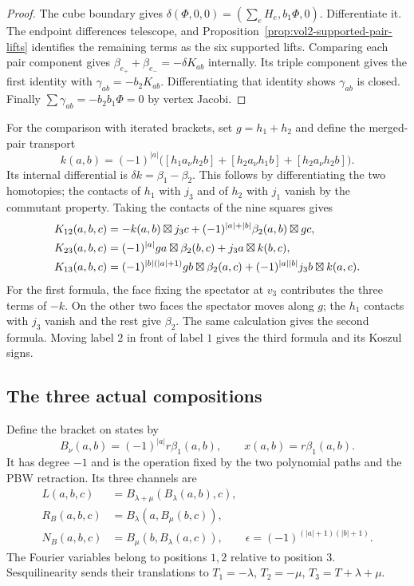 \begin{proof}
The cube boundary gives
$\delta(\Phi,0,0)=(\sum_eH_e,b_1\Phi,0)$.
Differentiate it. The endpoint differences telescope, and
Proposition~\ref{prop:vol2-supported-pair-lifts} identifies
the remaining terms as the six supported lifts. Comparing
each pair component gives
$\beta_{e_+}+\beta_{e_-}=-\delta K_{ab}$ internally.
Its triple component gives the first identity with
$\gamma_{ab}=-b_2K_{ab}$. Differentiating that identity shows
$\gamma_{ab}$ is closed. Finally
$\sum\gamma_{ab}=-b_2b_1\Phi=0$ by vertex Jacobi.
\end{proof}

For the comparison with iterated brackets, set $g=h_1+h_2$
and define the merged-pair transport
\[
 k(a,b)=(-1)^{|a|}
   \bigl([h_1a_\nu h_2b]+[h_2a_\nu h_1b]+[h_2a_\nu h_2b]\bigr).
\]
Its internal differential is $\delta k=\beta_1-\beta_2$.
This follows by differentiating the two homotopies; the
contacts of $h_1$ with $j_3$ and of $h_2$ with $j_1$
vanish by the commutant property. Taking the contacts of the
nine squares gives
\begin{align}\label{eq:vol2-cube-pair-formulas}
 K_{12}(a,b,c)&=-k(a,b)\boxtimes j_3c
          +(-1)^{|a|+|b|}\beta_2(a,b)\boxtimes gc,\notag\\
 K_{23}(a,b,c)&=(-1)^{|a|}ga\boxtimes\beta_2(b,c)
                                      +j_3a\boxtimes k(b,c),\\
 K_{13}(a,b,c)&=(-1)^{|b|(|a|+1)}gb\boxtimes\beta_2(a,c)
                         +(-1)^{|a||b|}j_3b\boxtimes k(a,c).
                         \notag
\end{align}
For the first formula, the face fixing the spectator at
$v_3$ contributes the three terms of $-k$. On the other two
faces the spectator moves along $g$; the $h_1$ contacts with
$j_3$ vanish and the rest give $\beta_2$. The same calculation
gives the second formula. Moving label $2$ in front of
label $1$ gives the third formula and its Koszul signs.

\subsection{The three actual compositions}

Define the bracket on states by
\[
 B_\nu(a,b)=(-1)^{|a|}r\beta_1(a,b),
 \qquad x(a,b)=r\beta_1(a,b).
\]
It has degree $-1$ and is the operation fixed by the two
polynomial paths and the PBW retraction. Its three channels
are
\begin{equation}\label{eq:vol2-supported-three-channels}
 \begin{split}
 L(a,b,c)&=B_{\lambda+\mu}(B_\lambda(a,b),c),\\
 R_B(a,b,c)&=B_\lambda(a,B_\mu(b,c)),\\
 N_B(a,b,c)&=B_\mu(b,B_\lambda(a,c)),
 \qquad \epsilon=(-1)^{(|a|+1)(|b|+1)}.
 \end{split}
\end{equation}
The Fourier variables belong to positions $1,2$ relative to
position $3$. Sesquilinearity sends their translations to
$T_1=-\lambda$, $T_2=-\mu$, $T_3=T+\lambda+\mu$.

